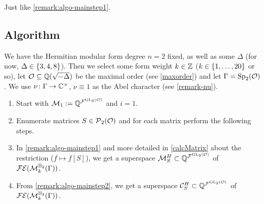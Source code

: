 \begin{remark}
\label{remark:algo-mainstep2}
Just like \cref{remark:algo-mainstep1}.
\end{remark}

\subsection{Algorithm}

\begin{algo}
\label{main-algo}
We have the Hermitian modular form degree $n = 2$ fixed, as well as some $\Delta$ (for now, $\Delta \in \Set{3,4,8}$). Then we select some form weight $k \in \mathbb{Z}$ ($k \in \Set{1,\dots,20}$ or so), let $\mathcal{O} \subseteq \mathbb{Q}(\sqrt{-\Delta})$ be the maximal order (see \cref{maxorder}) and let $\Gamma = \operatorname{Sp}_2(\mathcal{O})$. We use $\nu \colon \Gamma \rightarrow \mathbb{C}^\times$, $\nu \equiv 1$ as the Abel character (see \cref{remark-nu}).

\begin{enumerate}
\item
Start with $\mathcal{M}_1 := \mathbb{Q}^{{\mathcal{F}}^{\operatorname{GL}_2(\mathcal{O})}}$ and $i=1$.

\item\label{NextSStep} Enumerate matrices $S \in \operatorname{\mathcal{P}}_2(\mathcal{O})$ and for each matrix perform the following steps.


\item
In \cref{remark:algo-mainstep1} and more detailed in \cref{calcMatrix} about the restriction ($f \mapsto f[S]$), we get a superspace $\mathcal{M}^H_S \subset \mathbb{Q}^{{\mathcal{F}}^{\operatorname{GL}_2(\mathcal{O})}}$ of $\mathcal{FE}(\operatorname{\mathcal{M}}^{\mathbb{H}_{2}}_{k} (\Gamma))$.

\item
From \cref{remark:algo-mainstep2}, we get a superspace $\mathcal{C}^H_S \subset \mathbb{Q}^{{\mathcal{F}}^{\operatorname{GL}_2(\mathcal{O})}}$ of $\mathcal{FE}(\operatorname{\mathcal{M}}^{\mathbb{H}_{2}}_{k} (\Gamma))$.


\end{enumerate}
\end{algo}
